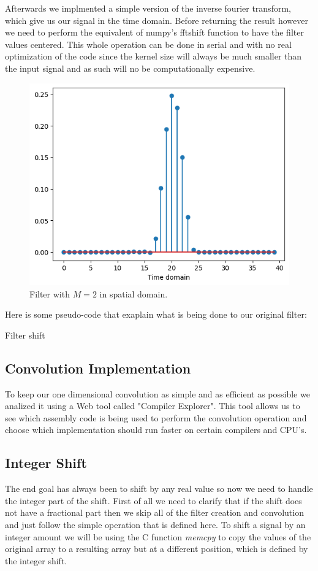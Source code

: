 \documentclass[]{usiinfbachelorproject}
\begin{document}
		 Afterwards we implmented a simple version of the inverse fourier transform, which give us our signal in the time domain. Before returning the result however we need to perform the equivalent of numpy's fftshift function to have the filter values centered. This whole operation can be done in serial and with no real optimization of the code since the kernel size will always be much smaller than the input signal and as such will no be computationally expensive.
		 \begin{figure}[h]
		 	\centering
		 	\includegraphics[width=0.4\columnwidth]{images/ifft_filter_m_2_25_shift.png}
		 	\caption{Filter with $M=2$ in spatial domain.}
		 	\label{final_filter}
		 \end{figure}
		 
		 
		
		Here is some pseudo-code that exaplain what is being done to our original filter:
		\begin{algorithm}
			\caption{Filter shift}\label{alg:cap}
		\end{algorithm}
		
		
		\subsection{Convolution Implementation}
		To keep our one dimensional convolution as simple and as efficient as possible we analized it using a Web tool called "Compiler Explorer"\cite{godbolt}. This tool allows us to see which assembly code is being used to perform the convolution operation and choose which implementation should run faster on certain compilers and CPU's.
		
		
		
		\subsection{Integer Shift}
		The end goal has always been to shift by any real value so now we need to handle the integer part of the shift. First of all we need to clarify that if the shift does not have a fractional part then we skip all of the filter creation and convolution and just follow the simple operation that is defined here.
		To shift a signal by an integer amount we will be using the C function \textsl{memcpy} to copy the values of the original array to a resulting array but at a different position, which is defined by the integer shift.
		
\end{document}
